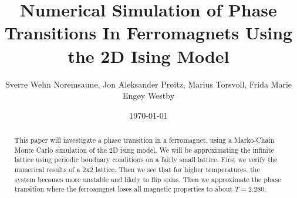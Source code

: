 \documentclass[english,notitlepage,reprint,nofootinbib]{revtex4-1}  %
\begin{document}
\title{Numerical Simulation of Phase Transitions In Ferromagnets Using the 2D Ising Model}  %
\author{Sverre Wehn Noremsaune, Jon Aleksander Prøitz, Marius Torsvoll, Frida Marie Engøy Westby} %
\date{\today}                             %
\noaffiliation                            %

\begin{abstract}
   This paper will investigate a phase transition in a ferromagnet, using a Marko-Chain Monte Carlo simulation of the 2D ising model. We will be approximating the infinite lattice using periodic boudnary conditions on a fairly small lattice. 
   First we verify the numerical results of a 2x2 lattice. Then we see that for higher temperatures, the system becomes more unstable and likely to flip spins. Then we approximate the phase transition where the ferroamgnet loses all magnetic properties to about $T=2.280$.
\end{abstract}
\maketitle


\end{document}
